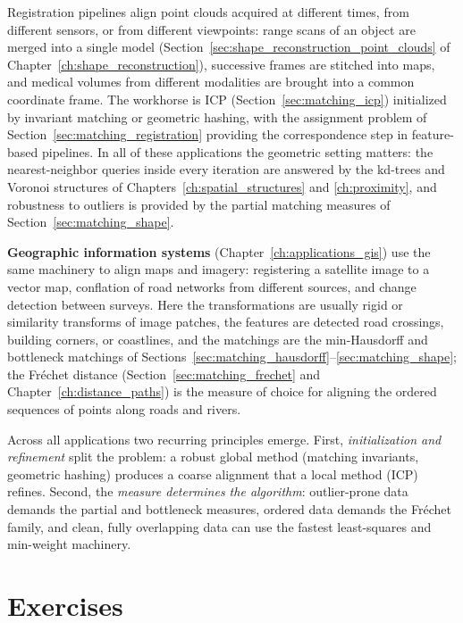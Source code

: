 Registration pipelines \cite{besl1992,chen1992,
alt1999} align point clouds acquired at different times, from different
sensors, or from different viewpoints: range scans of an object are merged
into a single model
(Section~\ref{sec:shape_reconstruction_point_clouds} of
Chapter~\ref{ch:shape_reconstruction}), successive frames are stitched into
maps, and medical volumes from different modalities are brought into a
common coordinate frame. The workhorse is ICP
(Section~\ref{sec:matching_icp}) initialized by invariant matching or
geometric hashing, with the assignment problem of
Section~\ref{sec:matching_registration} providing the correspondence step in
feature-based pipelines. In all of these applications the geometric setting
matters: the nearest-neighbor queries inside every iteration are answered by
the kd-trees and Voronoi structures of Chapters~\ref{ch:spatial_structures}
and \ref{ch:proximity}, and robustness to outliers is provided by the
partial matching measures of Section~\ref{sec:matching_shape}.

\textbf{Geographic information systems} (Chapter~\ref{ch:applications_gis})
use the same machinery to align maps and imagery: registering a satellite
image to a vector map, conflation of road networks from different sources,
and change detection between surveys. Here the transformations are usually
rigid or similarity transforms of image patches, the features are detected
road crossings, building corners, or coastlines, and the matchings are the
min-Hausdorff and bottleneck matchings of
Sections~\ref{sec:matching_hausdorff}--\ref{sec:matching_shape}; the
Fr\'echet distance (Section~\ref{sec:matching_frechet} and
Chapter~\ref{ch:distance_paths}) is the measure of choice for aligning the
ordered sequences of points along roads and rivers.

Across all applications two recurring principles emerge. First,
\emph{initialization and refinement} split the problem: a robust global
method (matching invariants, geometric hashing) produces a coarse alignment
that a local method (ICP) refines. Second, the \emph{measure determines the
algorithm}: outlier-prone data demands the partial and bottleneck measures,
ordered data demands the Fr\'echet family, and clean, fully overlapping data
can use the fastest least-squares and min-weight machinery.


\section{Exercises}
\label{sec:matching_exercises}


